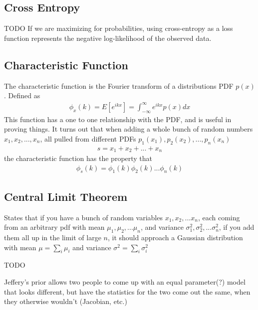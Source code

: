 \subsection{Cross Entropy}
TODO
If we are maximizing for probabilities, using cross-entropy as a loss function represents the negative log-likelihood of the observed data\cite{grus}.

\subsection{Characteristic Function}
The characteristic function is the Fourier transform of a distributions PDF $p(x)$. Defined as 
\begin{align}
\phi_x(k) = E[e^{ikx}] = \int_{-\infty}^\infty e^{ikx}p(x)dx
\end{align}
This function has a one to one relationship with the PDF, and is useful in proving things. It turns out that when adding a whole bunch of random numbers $x_1, x_2, ..., x_n$, all pulled from different PDFs $p_1(x_1), p_2(x_2), ..., p_n(x_n)$
\begin{align}
s = x_1 + x_2 + ... + x_n
\end{align}
the characteristic function has the property that
\begin{align}
\phi_s(k) =\phi_1(k)\phi_2(k)...\phi_n(k)
\end{align}


\subsection{Central Limit Theorem}
States that if you have a bunch of random variables $x_1, x_2, ... x_n$, each coming from an arbitrary pdf with mean $\mu_1, \mu_2, ... \mu_n$, and variance $\sigma_1^2, \sigma_2^2, ...\sigma_n^2$, if you add them all up in the limit of large $n$, it should approach a Gaussian distribution with mean $\mu = \sum_i \mu_i$ and variance $\sigma^2 = \sum_i\sigma_i^2$

TODO

Jeffery's prior allows two people to come up with an equal parameter(?) model that looks different, but have the statistics for the two come out the same, when they otherwise wouldn't (Jacobian, etc.)

